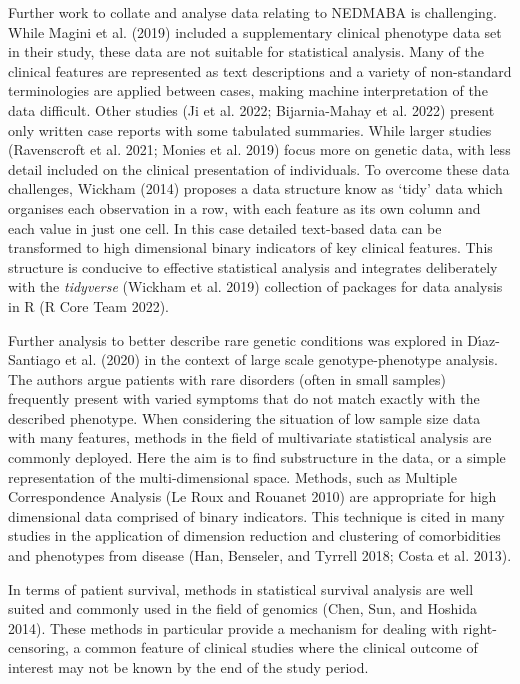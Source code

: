 \documentclass[
  letterpaper,
  DIV=11,
  numbers=noendperiod]{scrartcl}
\begin{document}
Further work to collate and analyse data relating to NEDMABA is
challenging. While Magini et al. (2019) included a supplementary
clinical phenotype data set in their study, these data are not suitable
for statistical analysis. Many of the clinical features are represented
as text descriptions and a variety of non-standard terminologies are
applied between cases, making machine interpretation of the data
difficult. Other studies (Ji et al. 2022; Bijarnia-Mahay et al. 2022)
present only written case reports with some tabulated summaries. While
larger studies (Ravenscroft et al. 2021; Monies et al. 2019) focus more
on genetic data, with less detail included on the clinical presentation
of individuals. To overcome these data challenges, Wickham (2014)
proposes a data structure know as `tidy' data which organises each
observation in a row, with each feature as its own column and each value
in just one cell. In this case detailed text-based data can be
transformed to high dimensional binary indicators of key clinical
features. This structure is conducive to effective statistical analysis
and integrates deliberately with the \emph{tidyverse} (Wickham et al.
2019) collection of packages for data analysis in R (R Core Team 2022).

Further analysis to better describe rare genetic conditions was explored
in Dı́az-Santiago et al. (2020) in the context of large scale
genotype-phenotype analysis. The authors argue patients with rare
disorders (often in small samples) frequently present with varied
symptoms that do not match exactly with the described phenotype. When
considering the situation of low sample size data with many features,
methods in the field of multivariate statistical analysis are commonly
deployed. Here the aim is to find substructure in the data, or a simple
representation of the multi-dimensional space. Methods, such as Multiple
Correspondence Analysis (Le Roux and Rouanet 2010) are appropriate for
high dimensional data comprised of binary indicators. This technique is
cited in many studies in the application of dimension reduction and
clustering of comorbidities and phenotypes from disease (Han, Benseler,
and Tyrrell 2018; Costa et al. 2013).

In terms of patient survival, methods in statistical survival analysis
are well suited and commonly used in the field of genomics (Chen, Sun,
and Hoshida 2014). These methods in particular provide a mechanism for
dealing with right-censoring, a common feature of clinical studies where
the clinical outcome of interest may not be known by the end of the
study period.
\end{document}
